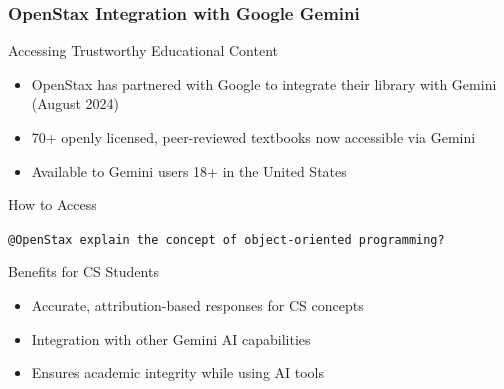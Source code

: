 \documentclass{beamer}
\begin{document}
\begin{frame}
\frametitle{OpenStax Integration with Google Gemini}

\begin{block}{Accessing Trustworthy Educational Content}
\begin{itemize}
\item OpenStax has partnered with Google to integrate their library with Gemini (August 2024)
\item 70+ openly licensed, peer-reviewed textbooks now accessible via Gemini
\item Available to Gemini users 18+ in the United States
\end{itemize}
\end{block}

\begin{exampleblock}{How to Access}
\begin{center}
\texttt{@OpenStax explain the concept of object-oriented programming?}
\end{center}
\end{exampleblock}

\begin{alertblock}{Benefits for CS Students}
\begin{itemize}
\item Accurate, attribution-based responses for CS concepts
\item Integration with other Gemini AI capabilities
\item Ensures academic integrity while using AI tools
\end{itemize}
\end{alertblock}
\end{frame}
\end{document}
